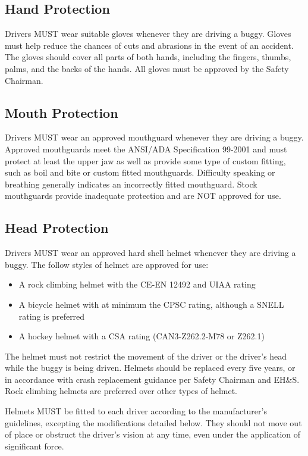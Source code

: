 \subsection{Hand Protection}

	Drivers MUST wear suitable gloves whenever they are driving a buggy. Gloves must help reduce the chances of cuts and abrasions in the event of an accident. The gloves should cover all parts of both hands, including the fingers, thumbs, palms, and the backs of the hands. All gloves must be approved by the Safety Chairman.

\subsection{Mouth Protection}

	Drivers MUST wear an approved mouthguard whenever they are driving a buggy. Approved mouthguards meet the ANSI/ADA Specification 99-2001 and must protect at least the upper jaw as well as provide some type of custom fitting, such as boil and bite or custom fitted mouthguards. Difficulty speaking or breathing generally indicates an incorrectly fitted mouthguard. Stock mouthguards provide inadequate protection and are NOT approved for use.

\subsection{Head Protection}

	Drivers MUST wear an approved hard shell helmet whenever they are driving a buggy. The follow styles of helmet are approved for use: 
	\begin{itemize}
		\item A rock climbing helmet with the CE-EN 12492 and UIAA rating
		\item A bicycle helmet with at minimum the CPSC rating, although a SNELL rating is preferred 
		\item A hockey helmet with a CSA rating (CAN3-Z262.2-M78 or Z262.1) 
	\end{itemize}

	The helmet must not restrict the movement of the driver or the driver's head while the buggy is being driven. Helmets should be replaced every five years, or in accordance with crash replacement guidance per Safety Chairman and EH\&S. Rock climbing helmets are preferred over other types of helmet. 
	
	Helmets MUST be fitted to each driver according to the manufacturer's guidelines, excepting the modifications detailed below. They should not move out of place or obstruct the driver's vision at any time, even under the application of significant force.

